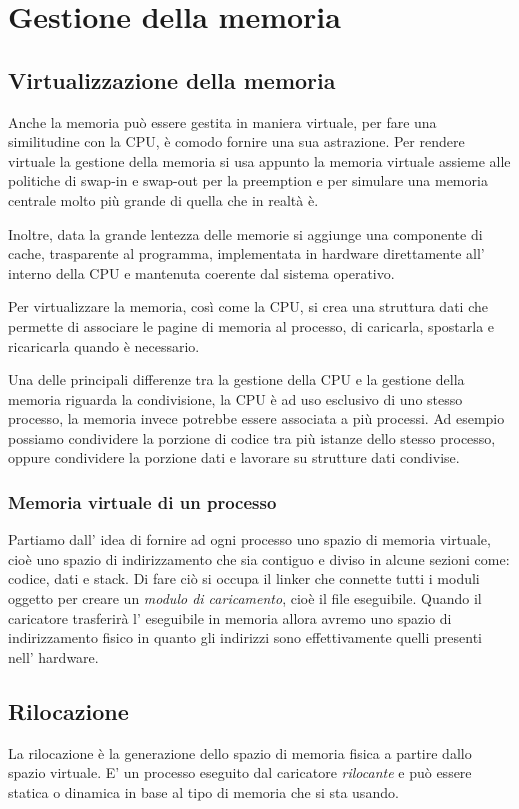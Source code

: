 \section{Gestione della memoria}
\subsection{Virtualizzazione della memoria}
Anche la memoria può essere gestita in maniera virtuale, per fare una similitudine con la CPU, è comodo fornire una sua astrazione.
Per rendere virtuale la gestione della memoria si usa appunto la memoria virtuale assieme alle politiche di swap-in e swap-out per la preemption e per simulare una memoria centrale molto più grande di quella che in realtà è.

Inoltre, data la grande lentezza delle memorie si aggiunge una componente di cache, trasparente al programma, implementata in hardware direttamente all' interno della CPU e mantenuta coerente dal sistema operativo.

Per virtualizzare la memoria, così come la CPU, si crea una struttura dati che permette di associare le pagine di memoria al processo, di caricarla, spostarla e ricaricarla quando è necessario.

Una delle principali differenze tra la gestione della CPU e la gestione della memoria riguarda la condivisione, la CPU è ad uso esclusivo di uno stesso processo, la memoria invece potrebbe essere associata a più processi.
Ad esempio possiamo condividere la porzione di codice tra più istanze dello stesso processo, oppure condividere la porzione dati e lavorare su strutture dati condivise.

\subsubsection{Memoria virtuale di un processo}
Partiamo dall' idea di fornire ad ogni processo uno spazio di memoria virtuale, cioè uno spazio di indirizzamento che sia contiguo e diviso in alcune sezioni come: codice, dati e stack.
Di fare ciò si occupa il linker che connette tutti i moduli oggetto per creare un \emph{modulo di caricamento}, cioè il file eseguibile.
Quando il caricatore trasferirà l' eseguibile in memoria allora avremo uno spazio di indirizzamento fisico in quanto gli indirizzi sono effettivamente quelli presenti nell' hardware.

\subsection{Rilocazione}
La rilocazione è la generazione dello spazio di memoria fisica a partire dallo spazio virtuale.
E' un processo eseguito dal caricatore \emph{rilocante} e può essere statica o dinamica in base al tipo di memoria che si sta usando.


